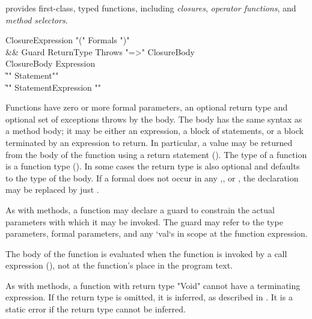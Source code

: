 \Xten{} provides first-class, typed functions, including
\emph{closures}, \emph{operator functions}, and \emph{method
  selectors}.

\begin{grammar}
ClosureExpression \:
        \xcd"("
        Formals\opt
        \xcd")"
\\ &&
        Guard\opt
        ReturnType\opt
        Throws\opt
        \xcd"=>" ClosureBody \\
ClosureBody \:
        Expression \\
        \| \xcd"{" Statement\star \xcd"}" \\
        \| \xcd"{" Statement\star Expression \xcd"}" \\
\end{grammar}

Functions have zero or more formal parameters, an optional return type
and optional set of exceptions throws by the body.  The body has the
same syntax as a method body; it may be either an expression, a block
of statements, or a block terminated by an expression to return. In
particular, a value may be returned from the body of the function
using a return statement (). The type of a
function is a function type ().  In some cases the
return type  is also optional and defaults to the type of the
body. If a formal  does not occur in any
,, or , the declaration  may
be replaced by just .

\label{ClosureGuard}

As with methods, a function may declare a guard to
constrain the actual parameters with which it may be invoked.
The guard may refer to the type parameters, formal parameters,
and any \xcd`val`s in scope at the function expression.

The body of the function is evaluated when the function is
invoked by a call expression (), not at the function's
place in the program text.

As with methods, a function with return type \xcd"Void" cannot
have a terminating expression. 
If the return type is omitted, it is inferred, as described in
.
It is a static error if the return type cannot be inferred. 


